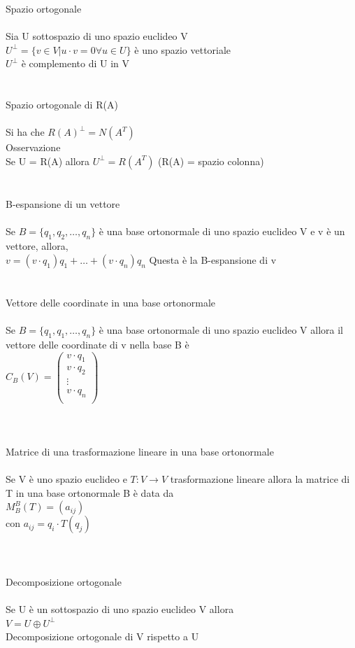 \documentclass{article}
\begin{document}
{\large Spazio ortogonale}\\\\
Sia U sottospazio di uno spazio euclideo V\\
\(U^\perp = \{v\in V | u \cdot v = 0 \forall u \in U\}\) è uno spazio vettoriale\\
\(U^\perp\) è complemento di U in V\\\\\\
{\large Spazio ortogonale di R(A)}\\\\
Si ha che \(R(A)^\perp = N(A^T)\)\\
Osservazione\\
Se U = R(A) allora \(U^\perp = R(A^T)\) (R(A) = spazio colonna)\\\\\\
B-espansione di un vettore\\\\
Se \(B= \{q_1,q_2,\ldots,q_n\}\) è una base ortonormale di uno spazio euclideo V e v è un vettore, allora,\\
\(v=(v\cdot q_1)q_1+\ldots+(v\cdot q_n)q_n\)    Questa è la B-espansione di v\\\\\\
Vettore delle coordinate in una base ortonormale\\\\
Se \(B=\{q_1,q_1,\ldots,q_n\}\) è una base ortonormale di uno spazio euclideo V allora il vettore delle coordinate di v nella base B è\\
\(C_B(V)=\left(
\begin{array}{c}
    v\cdot q_1 \\
    v\cdot q_2 \\
    \vdots     \\
    v\cdot q_n \\
\end{array}\right)\)\\\\\\\\
Matrice di una trasformazione lineare in una base ortonormale\\\\
Se V è uno spazio euclideo e \(T:V\rightarrow{}V\) trasformazione lineare allora la matrice di T in una base ortonormale B è data da\\
\(M_B^B(T)=(a_{ij})\)\\
con \(a_{ij} = q_i \cdot T(q_j)\)\\\\\\\\
Decomposizione ortogonale\\\\
Se U è un sottospazio di uno spazio euclideo V allora\\
\(V=U \oplus U^\perp\)\\
Decomposizione ortogonale di V rispetto a U\\\\
\end{document}
